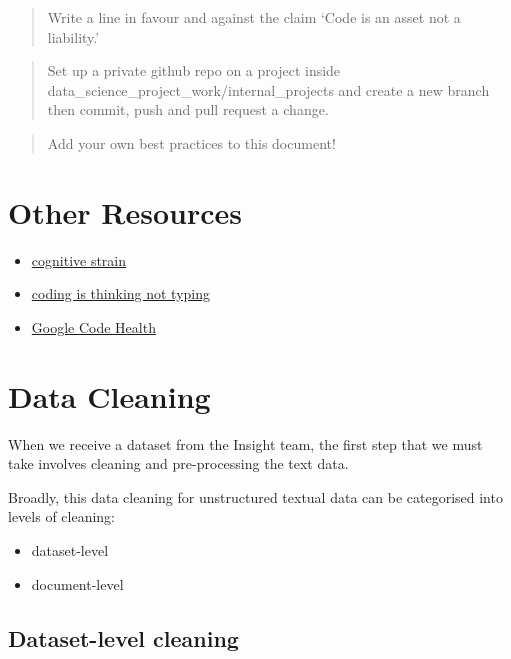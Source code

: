 \documentclass[
  letterpaper,
  DIV=11,
  numbers=noendperiod]{scrreprt}
\providecommand{\tightlist}{%
  \setlength{\itemsep}{0pt}\setlength{\parskip}{0pt}}\usepackage{longtable,booktabs,array}
\begin{document}
\begin{quote}
Write a line in favour and against the claim `Code is an asset not a
liability.'
\end{quote}

\begin{quote}
Set up a private github repo on a project inside
data\_science\_project\_work/internal\_projects and create a new branch
then commit, push and pull request a change.
\end{quote}

\begin{quote}
Add your own best practices to this document!
\end{quote}

\chapter{Other Resources}\label{other-resources}

\begin{itemize}
\tightlist
\item
  \href{https://link.springer.com/article/10.1007/s10648-019-09465-5}{cognitive
  strain}
\item
  \href{https://news.ycombinator.com/item?id=40103407\#:~:text=Programming\%20Is\%20Mostly\%20Thinking\%20(2014)\%20\%7C\%20Hacker\%20News&text=While\%20that\%20may\%20be\%20true,at\%20all\%20is\%20extremely\%20limited.}{coding
  is thinking not typing}
\item
  \href{https://testing.googleblog.com/2017/04/code-health-googles-internal-code.html}{Google
  Code Health}
\end{itemize}

\chapter{Data Cleaning}\label{data-cleaning}

When we receive a dataset from the Insight team, the first step that we
must take involves cleaning and pre-processing the text data.

Broadly, this data cleaning for unstructured textual data can be
categorised into levels of cleaning:

\begin{itemize}
\tightlist
\item
  dataset-level
\item
  document-level
\end{itemize}

\section{Dataset-level cleaning}\label{dataset-level-cleaning}
\end{document}
